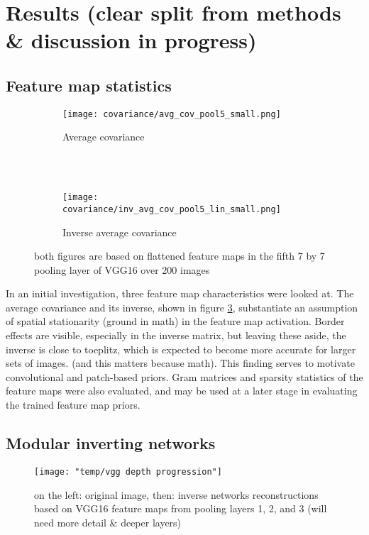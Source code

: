 \documentclass{article}
\begin{document}
\section{Results (clear split from methods \& discussion in progress)}

\subsection{Feature map statistics}


\begin{figure}
	\centering
	\begin{subfigure}[b]{0.3\textwidth}
		\texttt{[image: covariance/avg\_cov\_pool5\_small.png]}
		\caption{Average covariance \\~}
		\label{fig:cov}
	\end{subfigure}
	~
	\begin{subfigure}[b]{0.3\textwidth}
		\texttt{[image: covariance/inv\_avg\_cov\_pool5\_lin\_small.png]}
		\caption{Inverse average covariance}
		\label{fig:inv_cov}
	\end{subfigure}
	\caption{both figures are based on flattened feature maps in the fifth 7 by 7 pooling layer of VGG16 over 200 images}
	\label{fig:cov_plots}
\end{figure}

In an initial investigation, three feature map characteristics were looked at. The average covariance and its inverse, shown in figure \ref{fig:cov_plots}, substantiate an assumption of spatial stationarity (ground in math) in the feature map activation. Border effects are visible, especially in the inverse matrix, but leaving these aside, the inverse is close to toeplitz, which is expected to become more accurate for larger sets of images. (and this matters because math). This finding serves to motivate convolutional and patch-based priors. Gram matrices and sparsity statistics of the feature maps were also evaluated, and may be used at a later stage in evaluating the trained feature map priors.

\subsection{Modular inverting networks}

\begin{figure}
	\centering
	\texttt{[image: "temp/vgg depth progression"]}
	\caption{on the left: original image, then: inverse networks reconstructions based on VGG16 feature maps from pooling layers 1, 2, and 3 (will need more detail \& deeper layers)}
	\label{fig:invert_net_progression}
\end{figure}
\end{document}
